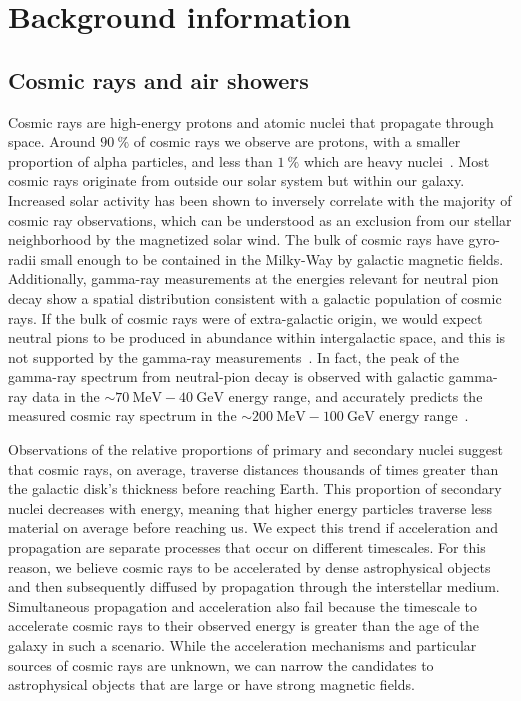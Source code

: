 \chapter{Background information}\label{chapter:background}

\section{Cosmic rays and air showers}

Cosmic rays are high-energy protons and atomic nuclei that propagate through space.
Around $\SI{90}\percent$ of cosmic rays we observe are protons, with a smaller proportion of alpha particles, and less than $\SI{1}\percent$ which are heavy nuclei~\cite{Gaisser:2016uoy}.
Most cosmic rays originate from outside our solar system but within our galaxy.
Increased solar activity has been shown to inversely correlate with the majority of cosmic ray observations, which can be understood as an exclusion from our stellar neighborhood by the magnetized solar wind.
The bulk of cosmic rays have gyro-radii small enough to be contained in the Milky-Way by galactic magnetic fields.
Additionally, gamma-ray measurements at the energies relevant for neutral pion decay show a spatial distribution consistent with a galactic population of cosmic rays.
If the bulk of cosmic rays were of extra-galactic origin, we would expect neutral pions to be produced in abundance within intergalactic space, and this is not supported by the gamma-ray measurements~\cite{Abdo:2009mr}.
In fact, the peak of the gamma-ray spectrum from neutral-pion decay is observed with galactic gamma-ray data in the $\sim\SI{70}\MeV-\SI{40}\GeV$ energy range, and accurately predicts the measured cosmic ray spectrum in the $\sim\SI{200}\MeV-\SI{100}\GeV$ energy range~\cite{Dermer:2013iwa}.

Observations of the relative proportions of primary and secondary nuclei suggest that cosmic rays, on average, traverse distances thousands of times greater than the galactic disk's thickness before reaching Earth.
This proportion of secondary nuclei decreases with energy, meaning that higher energy particles traverse less material on average before reaching us.
We expect this trend if acceleration and propagation are separate processes that occur on different timescales.
For this reason, we believe cosmic rays to be accelerated by dense astrophysical objects and then subsequently diffused by propagation through the interstellar medium.
Simultaneous propagation and acceleration also fail because the timescale to accelerate cosmic rays to their observed energy is greater than the age of the galaxy in such a scenario.
While the acceleration mechanisms and particular sources of cosmic rays are unknown, we can narrow the candidates to astrophysical objects that are large or have strong magnetic fields.


